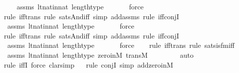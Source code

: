 \begin{isabellebody}
\ \ \isamarkupfalse%
\ assms\ lt{\isacharunderscore}{\kern0pt}nat{\isacharunderscore}{\kern0pt}in{\isacharunderscore}{\kern0pt}nat\ length{\isacharunderscore}{\kern0pt}type\ \isanewline
\ \ \ \ \isamarkupfalse%
\ force\isanewline
\ \ \ \isamarkupfalse%
{\isacharparenleft}{\kern0pt}rule\ iff{\isacharunderscore}{\kern0pt}trans{\isacharcomma}{\kern0pt}\ rule\ sats{\isacharunderscore}{\kern0pt}And{\isacharunderscore}{\kern0pt}iff{\isacharcomma}{\kern0pt}\ simp\ add{\isacharcolon}{\kern0pt}assms{\isacharcomma}{\kern0pt}\ rule\ iff{\isacharunderscore}{\kern0pt}conjI{}{\isacharparenright}{\kern0pt}\isanewline
\ \ \isamarkupfalse%
\ assms\ lt{\isacharunderscore}{\kern0pt}nat{\isacharunderscore}{\kern0pt}in{\isacharunderscore}{\kern0pt}nat\ length{\isacharunderscore}{\kern0pt}type\ \isanewline
\ \ \ \ \isamarkupfalse%
\ force\isanewline
\ \ \ \isamarkupfalse%
{\isacharparenleft}{\kern0pt}rule\ iff{\isacharunderscore}{\kern0pt}trans{\isacharcomma}{\kern0pt}\ rule\ sats{\isacharunderscore}{\kern0pt}And{\isacharunderscore}{\kern0pt}iff{\isacharcomma}{\kern0pt}\ simp\ add{\isacharcolon}{\kern0pt}assms{\isacharcomma}{\kern0pt}\ rule\ iff{\isacharunderscore}{\kern0pt}conjI{}{\isacharparenright}{\kern0pt}\isanewline
\ \ \isamarkupfalse%
\ assms\ lt{\isacharunderscore}{\kern0pt}nat{\isacharunderscore}{\kern0pt}in{\isacharunderscore}{\kern0pt}nat\ length{\isacharunderscore}{\kern0pt}type\ \isanewline
\ \ \ \ \isamarkupfalse%
\ force\isanewline
\ \ \ \isamarkupfalse%
{\isacharparenleft}{\kern0pt}rule\ iff{\isacharunderscore}{\kern0pt}trans{\isacharcomma}{\kern0pt}\ rule\ sats{\isacharunderscore}{\kern0pt}is{\isacharunderscore}{\kern0pt}{}{\isacharunderscore}{\kern0pt}fm{\isacharunderscore}{\kern0pt}iff{\isacharparenright}{\kern0pt}\isanewline
\ \ \isamarkupfalse%
\ assms\ lt{\isacharunderscore}{\kern0pt}nat{\isacharunderscore}{\kern0pt}in{\isacharunderscore}{\kern0pt}nat\ length{\isacharunderscore}{\kern0pt}type\ zero{\isacharunderscore}{\kern0pt}in{\isacharunderscore}{\kern0pt}M\ transM\ \isanewline
\ \ \ \ \ \ \isamarkupfalse%
\ auto{\isacharbrackleft}{\kern0pt}{}{\isacharbrackright}{\kern0pt}\isanewline
\ \ \isamarkupfalse%
{\isacharparenleft}{\kern0pt}rule\ iffI{\isacharcomma}{\kern0pt}\ force{\isacharcomma}{\kern0pt}\ clarsimp{\isacharparenright}{\kern0pt}\isanewline
\ \ \isamarkupfalse%
{\isacharparenleft}{\kern0pt}rule\ conjI{\isacharcomma}{\kern0pt}\ simp\ add{\isacharcolon}{\kern0pt}zero{\isacharunderscore}{\kern0pt}in{\isacharunderscore}{\kern0pt}M{\isacharparenright}{\kern0pt}\isanewline

\end{isabellebody}
